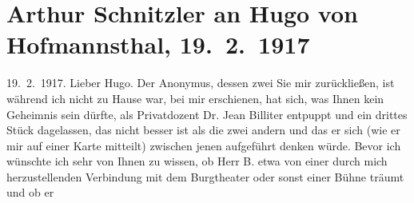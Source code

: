 

               \section[Arthur Schnitzler an Hugo von Hofmannsthal, 19. 2. 1917]{ Arthur Schnitzler an Hugo von Hofmannsthal, 19. 2. 1917}\nopagebreak{}\rehead{ }\begin{ledgroupsized}[t]{13cm}\normalsize\beginnumbering{} \toendnotes[C]{\smallbreak\pagebreak[2]} \toendnotes[C]{\smallbreak}\pstart
           \noindent{}{\pb}\label{K_L02256_1v}\label{K_L02256_1h}\hfill 19. 2. 1917.\pend
           \pstart{}Lieber Hugo.\pend\pstart
           Der Anonymus, dessen zwei
                  \label{K_L02256_2v}\label{K_L02256_2h}{ }Sie mir zurückließen, ist \label{K_L02256_3v}\label{K_L02256_3h} während ich nicht zu Hause war, bei mir erschienen, hat sich, was Ihnen kein
               Geheimnis sein dürfte, als Privatdozent Dr. Jean
                  Billiter entpuppt und ein drittes Stück dagelassen, das nicht besser ist als
               die zwei andern und das er sich (wie er mir auf einer Karte mitteilt) zwischen jenen
               aufgeführt denken würde. Bevor ich \label{K_L02256_4v}\label{K_L02256_4h} wünschte ich sehr von Ihnen zu wissen, ob Herr B. etwa von einer durch mich herzustellenden Verbindung mit dem Burgtheater oder sonst einer Bühne träumt und ob er

\end{ledgroupsized}
